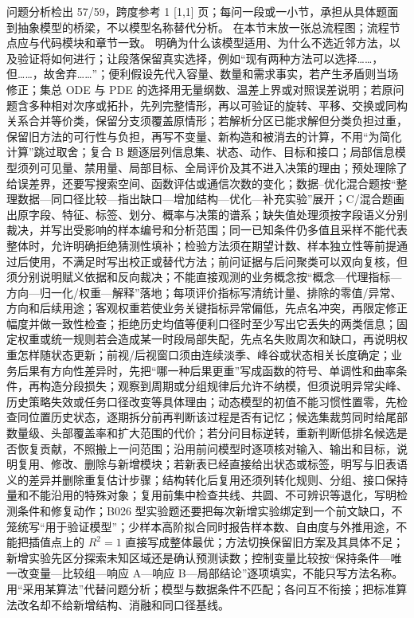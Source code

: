 \documentclass[withoutpreface,bwprint]{cumcmthesis}
\newcommand{\MCMAnalysisLength}{问题分析检出 57/59，跨度参考 1 [1,1] 页}
\begin{document}
  {\MCMAnalysisLength；每问一段或一小节，承担从具体题面到抽象模型的桥梁，不以模型名称替代分析。}
  {在本节末放一张总流程图；流程节点应与代码模块和章节一致。}
  {明确为什么该模型适用、为什么不选近邻方法，以及验证将如何进行；让段落保留真实选择，例如“现有两种方法可以选择……，但……，故舍弃……”；便利假设先代入容量、数量和需求事实，若产生矛盾则当场修正；集总 ODE 与 PDE 的选择用无量纲数、温差上界或对照误差说明；若原问题含多种相对次序或拓扑，先列完整情形，再以可验证的旋转、平移、交换或同构关系合并等价类，保留分支须覆盖原情形；若解析分区已能求解但分类负担过重，保留旧方法的可行性与负担，再写不变量、新构造和被消去的计算，不用“为简化计算”跳过取舍；复合 B 题逐层列信息集、状态、动作、目标和接口；局部信息模型须列可见量、禁用量、局部目标、全局评价及其不进入决策的理由；预处理除了给误差界，还要写搜索空间、函数评估或通信次数的变化；数据--优化混合题按“整理数据—同口径比较—指出缺口—增加结构—优化—补充实验”展开；C/混合题画出原字段、特征、标签、划分、概率与决策的谱系；缺失值处理须按字段语义分别裁决，并写出受影响的样本编号和分析范围；同一已知条件仍多值且采样不能代表整体时，允许明确拒绝猜测性填补；检验方法须在期望计数、样本独立性等前提通过后使用，不满足时写出校正或替代方法；前问证据与后问聚类可以双向复核，但须分别说明赋义依据和反向裁决；不能直接观测的业务概念按“概念—代理指标—方向—归一化/权重—解释”落地；每项评价指标写清统计量、排除的零值/异常、方向和后续用途；客观权重若使业务关键指标异常偏低，先点名冲突，再限定修正幅度并做一致性检查；拒绝历史均值等便利口径时至少写出它丢失的两类信息；固定权重或统一规则若会造成某一时段局部失配，先点名失败周次和缺口，再说明权重怎样随状态更新；前视/后视窗口须由连续淡季、峰谷或状态相关长度确定；业务后果有方向性差异时，先把“哪一种后果更重”写成函数的符号、单调性和曲率条件，再构造分段损失；观察到周期或分组规律后允许不纳模，但须说明异常尖峰、历史策略失效或任务口径改变等具体理由；动态模型的初值不能习惯性置零，先检查同位置历史状态，逐期拆分前再判断该过程是否有记忆；候选集裁剪同时给尾部数量级、头部覆盖率和扩大范围的代价；若分问目标逆转，重新判断低排名候选是否恢复贡献，不照搬上一问范围；沿用前问模型时逐项核对输入、输出和目标，说明复用、修改、删除与新增模块；若新表已经直接给出状态或标签，明写与旧表语义的差异并删除重复估计步骤；结构转化后复用还须列转化规则、分组、接口保持量和不能沿用的特殊对象；复用前集中检查共线、共圆、不可辨识等退化，写明检测条件和修复动作；B026 型实验题还要把每次新增实验绑定到一个前文缺口，不笼统写“用于验证模型”；少样本高阶拟合同时报告样本数、自由度与外推用途，不能把插值点上的 $R^2=1$ 直接写成整体最优；方法切换保留旧方案及其具体不足；新增实验先区分探索未知区域还是确认预测读数；控制变量比较按“保持条件—唯一改变量—比较组—响应 A—响应 B—局部结论”逐项填实，不能只写方法名称。}
  {用“采用某算法”代替问题分析；模型与数据条件不匹配；各问互不衔接；把标准算法改名却不给新增结构、消融和同口径基线。}
\end{document}
